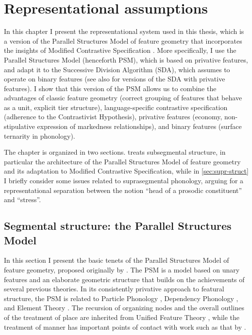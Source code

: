\chapter{Representational assumptions}
\label{cha:repr-assumpt}

In this chapter I present the representational system used in this thesis, which is a version of the Parallel Structures Model of feature geometry \citep{moren-psm,moren-serbian,moren-foa,kramer09:_italian,youssef09:_again_cairen_arabic,youssef10:_laryn_buchan_scots,iosad10:_motiv} that incorporates the insights of Modified Contrastive Specification \citep[\egm][]{torontoschool,dresher-hier,dresher09,ghini01:_asymm_miogl,ghini01:_place,dyck95:_const,currie07}. More specifically, I use the Parallel Structures Model (henceforth PSM), which is based on privative features, and adapt it to the Successive Division Algorithm (SDA), which \citet{dresher09} assumes to operate on binary features (see also \citealt{ghini01:_asymm_miogl,ghini01:_place,currie07} for versions of the SDA with privative features). I show that this version of the PSM allows us to combine the advantages of classic feature geometry (correct grouping of features that behave as a unit, explicit tier structure), language\hyp specific contrastive specification (adherence to the Contrastivist Hypothesis), privative features (economy, non\hyp stipulative expression of markedness relationships), and binary features (surface ternarity in phonology).

The chapter is organized in two sections.  treats subsegmental structure, in particular the architecture of the Parallel Structures Model of feature geometry and its adaptation to Modified Contrastive Specification, while in \cref{sec:supr-struct} I briefly consider some issues related to suprasegmental phonology, arguing for a representational separation between the notion \enquote{head of a prosodic constituent} and \enquote{stress}.

\section{Segmental structure: the Parallel Structures Model}
\label{sec:parall-struct-model}

In this section I present the basic tenets of the Parallel Structures Model of feature geometry, proposed originally by \citet{moren-psm}. The PSM is a model based on unary features and an elaborate geometric structure that builds on the achievements of several previous theories. In its consistently privative approach to featural structure, the PSM is related to Particle Phonology \citep{schane84}, Dependency Phonology \citep{anderson87:_princ_depen_phonol,ewencoll}, and Element Theory \citep[\egm][]{harris94:_englis,harris95,cyran10:_compl,backley11:_elemen_theor}. The recursion of organizing nodes and the overall outlines of the treatment of place are inherited from Unified Feature Theory \citep{clements91:_place,clements91:_vowel_bantu,clements-hume1995}, while the treatment of manner has important points of contact with work such as that by \citet{lombardi90,steriade93:_oralit}.

